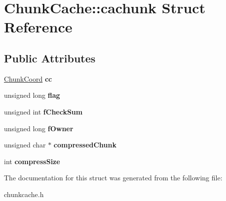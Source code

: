 \hypertarget{structChunkCache_1_1cachunk}{\section{\-Chunk\-Cache\-:\-:cachunk \-Struct \-Reference}
\label{structChunkCache_1_1cachunk}
}
\subsection*{\-Public \-Attributes}
\begin{DoxyCompactItemize}
\item 
\hypertarget{structChunkCache_1_1cachunk_a0bf5b082f1a23a305a7f9d8c0fbab7c1}{\hyperlink{structChunkCoord}{\-Chunk\-Coord} {\bfseries cc}}\label{structChunkCache_1_1cachunk_a0bf5b082f1a23a305a7f9d8c0fbab7c1}

\item 
\hypertarget{structChunkCache_1_1cachunk_a16f6431cffb6ad986370dc3b19195b62}{unsigned long {\bfseries flag}}\label{structChunkCache_1_1cachunk_a16f6431cffb6ad986370dc3b19195b62}

\item 
\hypertarget{structChunkCache_1_1cachunk_a99831672a39aa2745f333fea0b5f5927}{unsigned int {\bfseries f\-Check\-Sum}}\label{structChunkCache_1_1cachunk_a99831672a39aa2745f333fea0b5f5927}

\item 
\hypertarget{structChunkCache_1_1cachunk_acae83eb407e943b1a0f019e109d670a3}{unsigned long {\bfseries f\-Owner}}\label{structChunkCache_1_1cachunk_acae83eb407e943b1a0f019e109d670a3}

\item 
\hypertarget{structChunkCache_1_1cachunk_a7cc192461695cba3677b5de02668ee50}{unsigned char $\ast$ {\bfseries compressed\-Chunk}}\label{structChunkCache_1_1cachunk_a7cc192461695cba3677b5de02668ee50}

\item 
\hypertarget{structChunkCache_1_1cachunk_a8f56a4411e1b9c6966d4288d3595a153}{int {\bfseries compress\-Size}}\label{structChunkCache_1_1cachunk_a8f56a4411e1b9c6966d4288d3595a153}

\end{DoxyCompactItemize}


\-The documentation for this struct was generated from the following file\-:\begin{DoxyCompactItemize}
\item 
chunkcache.\-h\end{DoxyCompactItemize}
